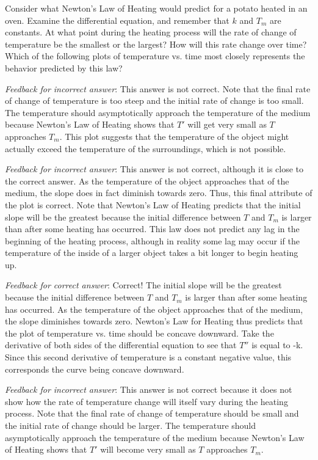 \documentclass{ximera}
\begin{document}
Consider what Newton's Law of Heating would predict for a potato heated in an oven.  Examine the differential equation, and remember that $k$ and $T_m$ are constants.  At what point during the heating process will the rate of change of temperature be the smallest or the largest?  How will this rate change over time?  Which of the following plots of temperature vs. time most closely represents the behavior predicted by this law?
 
 
\emph{Feedback for incorrect answer}: This answer is not correct.  Note that the final rate of change of temperature is too steep and the initial rate of change is too small.  The temperature should asymptotically approach the temperature of the medium because Newton's Law of Heating shows that $T'$ will get very small as $T$ approaches $T_m$.  This plot suggests that the temperature of the object might actually exceed the temperature of the surroundings, which is not possible.
 
\emph{Feedback for incorrect answer}: This answer is not correct, although it is close to the correct answer.  As the temperature of the object approaches that of the medium, the slope does in fact diminish towards zero.  Thus, this final attribute of the plot is correct.  Note that Newton's Law of Heating predicts that the initial slope will be the greatest because the initial difference between $T$ and $T_m$ is larger than after some heating has occurred.  This law does not predict any lag in the beginning of the heating process, although in reality some lag may occur if the temperature of the inside of a larger object takes a bit longer to begin heating up. 
  
\emph{Feedback for correct answer}: Correct!  The initial slope will be the greatest because the initial difference between $T$ and $T_m$ is larger than after some heating has occurred.  As the temperature of the object approaches that of the medium, the slope diminishes towards zero.  Newton's Law for Heating thus predicts that the plot of temperature vs. time should be concave downward.  Take the derivative of both sides of the differential equation to see that $T''$ is equal to -k.  Since this second derivative of temperature is a constant negative value, this corresponds the curve being concave downward.
 
  
\emph{Feedback for incorrect answer}: This answer is not correct because it does not show how the rate of temperature change will itself vary during the heating process.  Note that the final rate of change of temperature should be small and the initial rate of change should be larger.  The temperature should asymptotically approach the temperature of the medium because Newton's Law of Heating shows that $T'$ will become very small as $T$ approaches $T_m$.
 
\end{document}
